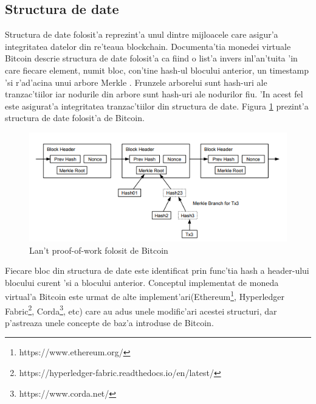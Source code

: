 \documentclass[12pt,a4paper,twoside]{report}
\begin{document}
	\subsection{Structura de date}
	Structura de date folosit'a reprezint'a unul dintre mijloacele care asigur'a integritatea datelor din re'teaua blockchain. Documenta'tia monedei virtuale Bitcoin descrie structura de date folosit'a ca fiind o list'a invers inl'an'tuita 'in care fiecare element, numit bloc, con'tine hash-ul blocului anterior, un timestamp 'si r'ad'acina unui arbore Merkle \cite{merkle}. Frunzele arborelui sunt hash-uri ale tranzac'tiilor iar nodurile din arbore sunt hash-uri ale nodurilor fiu. 'In acest fel este asigurat'a integritatea tranzac'tiilor din structura de date. Figura \ref{fig:btc} prezint'a structura de date folosit'a de Bitcoin\cite{bitcoin}.
	
		\begin{figure}[H]
		\begin{center}
			\includegraphics[scale=2.5]{img/btc.png}
			\caption{Lan't proof-of-work folosit de Bitcoin\cite{bitcoin}}
  			\label{fig:btc}
  		\end{center}
  		\end{figure} 
	
	
	
	Fiecare bloc din structura de date este identificat prin func'tia hash a header-ului blocului curent 'si a blocului anterior. Conceptul implementat de moneda virtual'a Bitcoin este urmat de alte implement'ari(Ethereum\footnote{https://www.ethereum.org/}, Hyperledger Fabric\footnote{https://hyperledger-fabric.readthedocs.io/en/latest/}, Corda\footnote{https://www.corda.net/}, etc) care au adus unele modific'ari acestei structuri, dar p'astreaza unele concepte de baz'a introduse de Bitcoin. 
\end{document}
